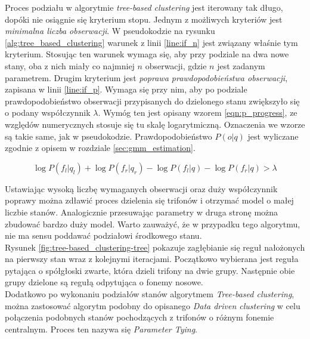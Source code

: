 \documentclass[shortabstract, mgr]{iithesis}
\begin{document}
	Proces podziału w algorytmie \textit{tree-based clustering} jest iterowany tak długo, dopóki nie osiągnie się kryterium stopu. Jednym z możliwych kryteriów jest \textit{minimalna liczba obserwacji}. W pseudokodzie na rysunku \ref{alg:tree_based_clustering} warunek z linii \ref{line:if_n} jest związany właśnie tym kryterium. Stosując ten warunek wymaga się, aby przy podziale na dwa nowe stany, oba z nich miały co najmniej $n$ obserwacji, gdzie $n$ jest zadanym parametrem. Drugim kryterium jest \textit{poprawa prawdopodobieństwa obserwacji}, zapisana w linii \ref{line:if_p}. Wymaga się przy nim, aby po podziale prawdopodobieństwo obserwacji przypisanych do dzielonego stanu zwiększyło się o podany współczynnik $\lambda$. Wymóg ten jest opisany wzorem \ref{eqn:p_progress}, ze względów numerycznych stosuje się tu skalę logarytmiczną. Oznaczenia we wzorze są takie same, jak w pseudokodzie. Prawdopodobieństwo $P(o|q)$ jest wyliczane zgodnie z opisem w rozdziale \ref{sec:gmm_estimation}.
	 
	 \begin{equation}
	 	\log{P(f_l | q_l)} + \log{P(f_r | q_r)} - \log{P(f_l | q)} - \log{P(f_r | q)} > \lambda
	 	\label{eqn:p_progress}
	 \end{equation}
	 
	Ustawiając wysoką liczbę wymaganych obserwacji oraz duży współczynnik poprawy można zdławić proces dzielenia się trifonów i otrzymać model o małej liczbie stanów. Analogicznie przesuwając parametry w druga stronę można zbudować bardzo duży model. Warto zauważyć, że w przypadku tego algorytmu, nie ma sensu poddawać podziałowi środkowego stanu.  \\
	Rysunek \ref{fig:tree-based_clustering-tree} pokazuje zagłębianie się reguł nałożonych na pierwszy stan wraz z kolejnymi iteracjami. Początkowo wybierana jest reguła pytająca o spółgłoski zwarte, która dzieli trifony na dwie grupy. Następnie obie grupy dzielone są regułą odpytująca o fonemy nosowe. \\
	Dodatkowo po wykonaniu podziałów stanów algorytmem \textit{Tree-based clustering}, można zastosować algorytm podobny do opisanego \textit{Data driven clustering} w celu połączenia podobnych stanów pochodzących z trifonów o różnym fonemie centralnym. Proces ten nazywa się \textit{Parameter Tying}.
	
\end{document}
